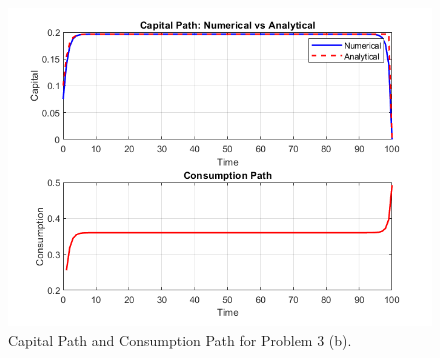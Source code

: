 \documentclass[12pt]{article}
\begin{document}
\begin{enumerate}
    \begin{figure}[h!]
    \centering
        \includegraphics[width=\textwidth]{3b.png}
        \caption{Capital Path and Consumption Path for Problem 3 (b).}
        \label{fig:3b}
\end{figure}
    
\end{enumerate}
\end{document}
